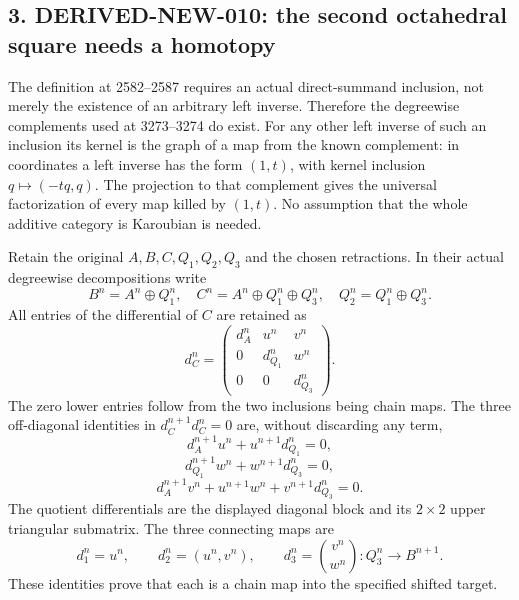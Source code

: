 \documentclass[11pt]{article}
\begin{document}
\subsection{\texorpdfstring{3. DERIVED-NEW-010:\allowbreak{} the second octahedral square needs a homotopy}{3.  the second octahedral square needs a homotopy}}\label{proofs-2995-3485-derived-new-010-the-second-octahedral-square-needs-a-homotopy}

The definition at 2582–\allowbreak{}2587 requires an actual direct-summand inclusion,\allowbreak{} not merely the existence of an arbitrary left inverse. Therefore the degreewise complements used at 3273–\allowbreak{}3274 do exist. For any other left inverse of such an inclusion its kernel is the graph of a map from the known complement:\allowbreak{} in coordinates a left inverse has the form \((1,t)\),\allowbreak{} with kernel inclusion \(q\mapsto(-tq,q)\). The projection to that complement gives the universal factorization of every map killed by \((1,t)\). No assumption that the whole additive category is Karoubian is needed.

Retain the original \(A,B,C,Q_1,Q_2,Q_3\) and the chosen retractions. In their actual degreewise decompositions write \[
B^n=A^n\oplus Q_1^n,\quad
C^n=A^n\oplus Q_1^n\oplus Q_3^n,\quad
Q_2^n=Q_1^n\oplus Q_3^n.
\] All entries of the differential of \(C\) are retained as \[
d_C^n=\begin{pmatrix}
d_A^n&u^n&v^n\\0&d_{Q_1}^n&w^n\\0&0&d_{Q_3}^n
\end{pmatrix}.
\] The zero lower entries follow from the two inclusions being chain maps. The three off-diagonal identities in \(d_C^{n+1}d_C^n=0\) are,\allowbreak{} without discarding any term,\allowbreak{} \[
d_A^{n+1}u^n+u^{n+1}d_{Q_1}^n=0,
\] \[
d_{Q_1}^{n+1}w^n+w^{n+1}d_{Q_3}^n=0,
\] \[
d_A^{n+1}v^n+u^{n+1}w^n+v^{n+1}d_{Q_3}^n=0.
\] The quotient differentials are the displayed diagonal block and its \(2\times2\) upper triangular submatrix. The three connecting maps are \[
d_1^n=u^n,\qquad d_2^n=(u^n,v^n),\qquad
d_3^n=\binom{v^n}{w^n}:Q_3^n\to B^{n+1}.
\] These identities prove that each is a chain map into the specified shifted target.
\end{document}

